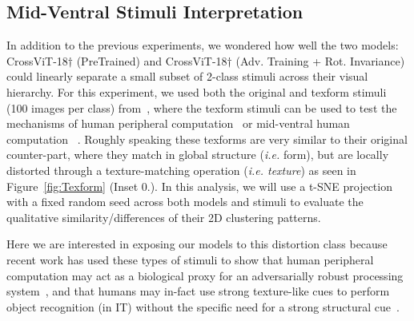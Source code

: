 \documentclass{article} %
\begin{document}

\subsection{Mid-Ventral Stimuli Interpretation}
\label{sec:Texform}
In addition to the previous experiments, we wondered how well the two models: CrossViT-18$\dagger$ (PreTrained) and CrossViT-18$\dagger$ (Adv. Training + Rot. Invariance) could linearly separate a small subset of 2-class stimuli across their visual hierarchy. For this experiment, we used both the original and texform stimuli (100 images per class) from~\cite{harrington2022finding}, where the texform stimuli can be used to test the mechanisms of human peripheral computation~\citep{rosenholtz2012summary,freeman2011metamers} or mid-ventral human computation ~\citep{long2018mid,jagadeesh2022texture}. Roughly speaking these texforms are very similar to their original counter-part, where they match in global structure (\textit{i.e.} form), but are locally distorted through a texture-matching operation (\textit{i.e. texture}) as seen in Figure~\ref{fig:Texform} (Inset 0.). In this analysis, we will use a t-SNE projection with a fixed random seed across both models and stimuli to evaluate the qualitative similarity/differences of their 2D clustering patterns.

Here we are interested in exposing our models to this distortion class because recent work has used these types of stimuli to show that human peripheral computation may act as a biological proxy for an adversarially robust processing system~\citep{harrington2022finding}, and that humans may in-fact use strong texture-like cues to perform object recognition (in IT) without the specific need for a strong structural cue~\citep{jagadeesh2022texture}.
\end{document}
